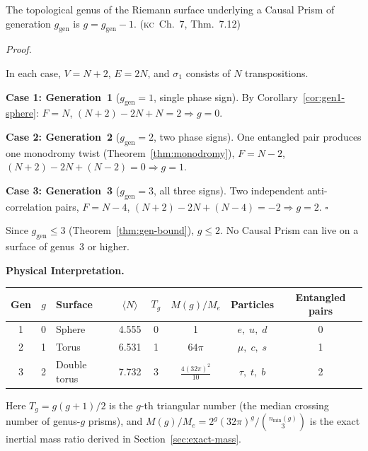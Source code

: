 \documentclass[11pt, a4paper, openany]{book}
\newcommand{\KC}[1]{\textnormal{(\textsc{kc}~#1)}}
\newcounter{thm}[chapter]
\renewenvironment{proof}[1][Proof]{%
  \par\noindent\textit{#1.}\quad
}{\hfill$\square$\par\medskip}
\begin{document}
\begin{theorem}\label{thm:gen-genus}
The topological genus of the Riemann surface underlying a Causal Prism of generation $g_{\mathrm{gen}}$ is $g = g_{\mathrm{gen}} - 1$. \KC{Ch.~7, Thm.~7.12}
\end{theorem}

\begin{proof}
In each case, $V = N + 2$, $E = 2N$, and $\sigma_1$ consists of $N$ transpositions.

\textbf{Case 1: Generation~1} ($g_{\mathrm{gen}} = 1$, single phase sign). By Corollary~\ref{cor:gen1-sphere}: $F = N$, $(N+2) - 2N + N = 2 \Rightarrow g = 0$. \checkmark

\textbf{Case 2: Generation~2} ($g_{\mathrm{gen}} = 2$, two phase signs). One entangled pair produces one monodromy twist (Theorem~\ref{thm:monodromy}), $F = N - 2$, $(N+2) - 2N + (N-2) = 0 \Rightarrow g = 1$. \checkmark

\textbf{Case 3: Generation~3} ($g_{\mathrm{gen}} = 3$, all three signs). Two independent anti-correlation pairs, $F = N - 4$, $(N+2) - 2N + (N-4) = -2 \Rightarrow g = 2$. \checkmark
\end{proof}

\begin{corollary}\label{cor:genus-bound}
Since $g_{\mathrm{gen}} \le 3$ (Theorem~\ref{thm:gen-bound}), $g \le 2$. No Causal Prism can live on a surface of genus~3 or higher.
\end{corollary}

\noindent\textbf{Physical Interpretation.}

\begin{center}
\renewcommand{\arraystretch}{1.2}
\begin{tabular}{cclccccc}
\toprule
Gen & $g$ & Surface & $\langle N \rangle$ & $T_g$ & $M(g)/M_e$ & Particles & Entangled pairs \\
\midrule
1 & 0 & Sphere        & 4.555 & 0 & 1        & $e,\; u,\; d$ & 0 \\
2 & 1 & Torus         & 6.531 & 1 & $64\pi$  & $\mu,\; c,\; s$ & 1 \\
3 & 2 & Double torus  & 7.732 & 3 & $\tfrac{4(32\pi)^2}{10}$ & $\tau,\; t,\; b$ & 2 \\
\bottomrule
\end{tabular}
\end{center}

\noindent Here $T_g = g(g+1)/2$ is the $g$-th triangular number
(the median crossing number of genus-$g$ prisms), and
$M(g)/M_e = 2^g (32\pi)^g / \binom{n_{\min}(g)}{3}$ is the
exact inertial mass ratio derived in
Section~\ref{sec:exact-mass}.
\end{document}
